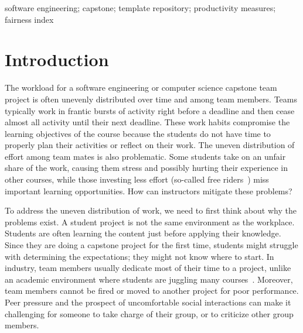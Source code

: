 \documentclass[10pt, conference]{IEEEtran}
\begin{document}
\begin{IEEEkeywords}
software engineering; capstone; template repository; productivity measures;
fairness index
\end{IEEEkeywords}

\section{Introduction} \label{SecIntro}

The workload for a software engineering or computer science capstone team
project is often unevenly distributed over time and among team members.  Teams
typically work in frantic bursts of activity right before a deadline and then
cease almost all activity until their next deadline.  These work habits
compromise the learning objectives of the course because the students do not
have time to properly plan their activities or reflect on their work.  The
uneven distribution of effort among team mates is also problematic.  Some
students take on an unfair share of the work, causing them stress and possibly
hurting their experience in other courses, while those investing less effort
(so-called free riders~\cite{tushevUsingGitHubLarge2020}) miss important
learning opportunities.  How can instructors mitigate these problems?

To address the uneven distribution of work, we need to first think about why the
problems exist.  A student project is not the same environment as the workplace.
Students are often learning the content just before applying their knowledge.
Since they are doing a capstone project for the first time, students might
struggle with determining the expectations; they might not know where to start.
In industry, team members usually dedicate most of their time to a project, unlike
an academic environment where students are juggling many
courses~\cite{connReusableAcademicstrengthMetricsbased2004}. Moreover, team
members cannot be fired or moved to another project for poor performance.  Peer
pressure and the prospect of uncomfortable social interactions can make it
challenging for someone to take charge of their group, or to criticize other
group members. %

\end{document}
